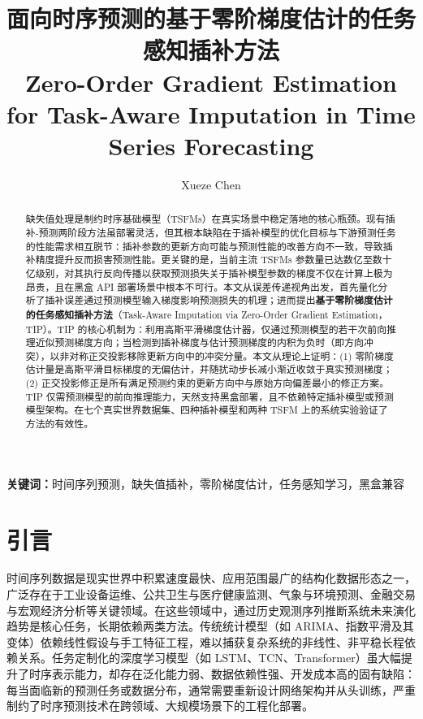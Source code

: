 \documentclass{article}
\title{\heiti\zihao{2} 面向时序预测的基于零阶梯度估计的任务感知插补方法\\ Zero-Order Gradient Estimation for Task-Aware Imputation in Time Series Forecasting}
\author{\songti Xueze Chen}
\date{}
\begin{document}
	\maketitle
	\thispagestyle{empty}

\begin{abstract}
	缺失值处理是制约时序基础模型（TSFMs）在真实场景中稳定落地的核心瓶颈。现有插补-预测两阶段方法虽部署灵活，但其根本缺陷在于插补模型的优化目标与下游预测任务的性能需求相互脱节：插补参数的更新方向可能与预测性能的改善方向不一致，导致插补精度提升反而损害预测性能。更关键的是，当前主流 TSFMs 参数量已达数亿至数十亿级别，对其执行反向传播以获取预测损失关于插补模型参数的梯度不仅在计算上极为昂贵，且在黑盒 API 部署场景中根本不可行。本文从误差传递视角出发，首先量化分析了插补误差通过预测模型输入梯度影响预测损失的机理；进而提出\textbf{基于零阶梯度估计的任务感知插补方法}（Task-Aware Imputation via Zero-Order Gradient Estimation，TIP）。TIP 的核心机制为：利用高斯平滑梯度估计器，仅通过预测模型的若干次前向推理近似预测梯度方向；当检测到插补梯度与估计预测梯度的内积为负时（即方向冲突），以非对称正交投影移除更新方向中的冲突分量。本文从理论上证明：(1) 零阶梯度估计量是高斯平滑目标梯度的无偏估计，并随扰动步长减小渐近收敛于真实预测梯度；(2) 正交投影修正是所有满足预测约束的更新方向中与原始方向偏差最小的修正方案。TIP 仅需预测模型的前向推理能力，天然支持黑盒部署，且不依赖特定插补模型或预测模型架构。在七个真实世界数据集、四种插补模型和两种 TSFM 上的系统实验验证了方法的有效性。
\end{abstract}

\noindent\textbf{关键词：}时间序列预测，缺失值插补，零阶梯度估计，任务感知学习，黑盒兼容

\section{引言}

时间序列数据是现实世界中积累速度最快、应用范围最广的结构化数据形态之一，广泛存在于工业设备运维\cite{kashpruk2023}、公共卫生与医疗健康监测\cite{10.1093/ije/dyw098}、气象与环境预测\cite{KAREVAN20201}、金融交易与宏观经济分析\cite{BAI2008304}等关键领域。在这些领域中，通过历史观测序列推断系统未来演化趋势是核心任务，长期依赖两类方法。传统统计模型（如 ARIMA、指数平滑及其变体）依赖线性假设与手工特征工程，难以捕获复杂系统的非线性、非平稳长程依赖关系。任务定制化的深度学习模型（如 LSTM、TCN、Transformer）虽大幅提升了时序表示能力，却存在泛化能力弱、数据依赖性强、开发成本高的固有缺陷：每当面临新的预测任务或数据分布，通常需要重新设计网络架构并从头训练，严重制约了时序预测技术在跨领域、大规模场景下的工程化部署\cite{潘志松2025基于深度学习的时间序列预测方法综述}。
\end{document}
